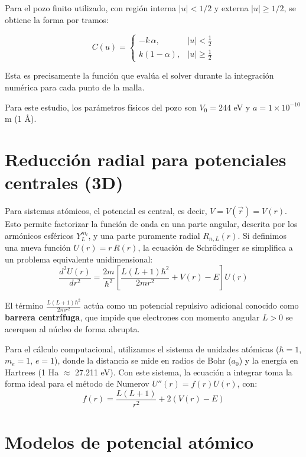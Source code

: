 \documentclass[11pt]{article}
\begin{document}
Para el pozo finito utilizado, con región interna \(|u|<1/2\) y externa
\(|u|\geq 1/2\), se obtiene la forma por tramos:

\[
C(u)=
\begin{cases}
-k\,\alpha, & |u|<\frac{1}{2} \\
k(1-\alpha), & |u|\geq\frac{1}{2}
\end{cases}
\]

Esta es precisamente la función que evalúa el solver durante la integración
numérica para cada punto de la malla.

Para este estudio, los parámetros físicos del pozo son \(V_0 = 244\) eV
y \(a = 1 \times 10^{-10}\) m (1 Å).

\section{Reducción radial para potenciales centrales (3D)}\label{reducciuxf3n-radial-para-potenciales-centrales-3d}

Para sistemas atómicos, el potencial es central, es decir,
\(V = V(\vec{r}) = V(r)\). Esto permite factorizar la función de onda en
una parte angular, descrita por los armónicos esféricos \(Y_L^{m_l}\), y
una parte puramente radial \(R_{n,L}(r)\). Si definimos una nueva
función \(U(r) = r\,R(r)\), la ecuación de Schrödinger se simplifica a
un problema equivalente unidimensional:
\[\frac{d^2 U(r)}{dr^2} = \frac{2m}{\hbar^2}\left[\frac{L(L+1)\hbar^2}{2mr^2} + V(r) - E\right]U(r)\]

El término \(\frac{L(L+1)\hbar^2}{2mr^2}\) actúa como un potencial
repulsivo adicional conocido como \textbf{barrera centrífuga}, que
impide que electrones con momento angular \(L > 0\) se acerquen al
núcleo de forma abrupta.

Para el cálculo computacional, utilizamos el sistema de unidades
atómicas (\(\hbar = 1\), \(m_e = 1\), \(e = 1\)), donde la distancia se
mide en radios de Bohr (\(a_0\)) y la energía en Hartrees (1 Ha
\(\approx\) 27.211 eV). Con este sistema, la ecuación a integrar toma la
forma ideal para el método de Numerov \(U''(r) = f(r)U(r)\), con:
\[f(r) = \frac{L(L+1)}{r^2} + 2(V(r) - E)\]

\section{Modelos de potencial atómico}\label{modelos-de-potencial-atuxf3mico}
\end{document}
